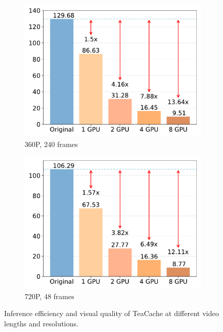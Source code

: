 \begin{figure}
\begin{minipage}{\textwidth}
\begin{subfigure}{0.24\textwidth}
        \centering
        \includegraphics[width=\textwidth]{figs/360_240.pdf}
        \caption{360P, 240 frames}
    \end{subfigure}
    \hfill
    \begin{subfigure}{0.24\textwidth}
        \centering
        \includegraphics[width=\textwidth]{figs/720_48.pdf}
        \caption{720P, 48 frames}
    \end{subfigure}

    \end{minipage}

    \caption{Inference efficiency and visual quality of TeaCache at different video lengths and resolutions.}
    \label{fig:multi resolution}
\end{figure}



